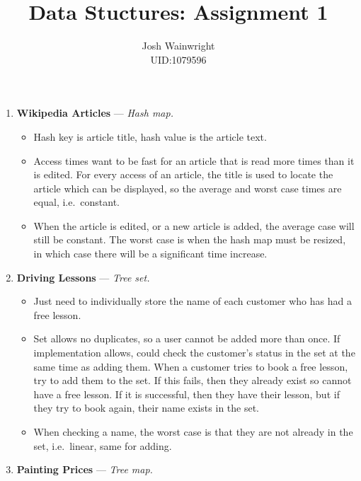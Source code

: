 \documentclass[11pt]{article} %
\author{Josh Wainwright \\ UID:1079596}
\title{Data Stuctures: Assignment 1 }
\date{}
\begin{document}
\maketitle

\begin{enumerate}
	\item \textbf{Wikipedia Articles} --- \textit{Hash map.}

		\begin{itemize}
			\item Hash key is article title, hash value is the article text.
			\item Access times want to be fast for an article that is read more
			times than it is edited. For every access of an article, the title
			is used to locate the article which can be displayed, so the
			average and worst case times are equal, i.e.\ constant.
			\item When the article is edited, or a new article is added, the
			average case will still be constant. The worst case is when the
			hash map must be resized, in which case there will be a significant
			time increase.
		\end{itemize}

	\item \textbf{Driving Lessons } --- \textit{Tree set.}

		\begin{itemize}
			\item Just need to individually store the name of each customer who
			has had a free lesson.
			\item Set allows no duplicates, so a user cannot be added more than
			once.  If implementation allows, could check the customer's status
			in the set at the same time as adding them. When a customer tries
			to book a free lesson, try to add them to the set. If this fails,
			then they already exist so cannot have a free lesson. If it is
			successful, then they have their lesson, but if they try to book
			again, their name exists in the set.
			\item When checking a name, the worst case is that they are not
			already in the set, i.e.\ linear, same for adding.
		\end{itemize}

	\item \textbf{Painting Prices} --- \textit{Tree map.}


\end{enumerate}
\end{document}
